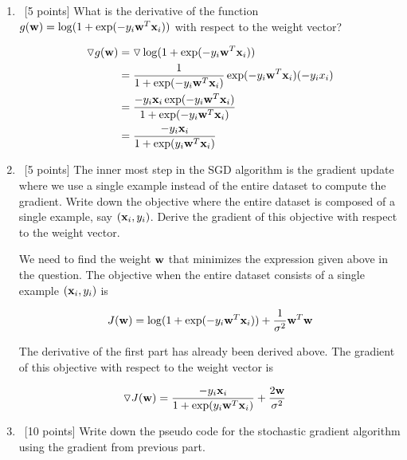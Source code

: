 \begin{enumerate}
\item ~[5 points] What is the derivative of the function $g({\bf w}) = \log(1+ \exp(-y_i{\bf w}^T{\bf x}_i))$ with respect to the weight vector?

\begin{equation*}
\begin{aligned}
\triangledown g({\bf w}) &= \triangledown \log(1+ \exp(-y_i{\bf w}^T{\bf x}_i))\\
&= \frac{1}{1+ \exp(-y_i{\bf w}^T{\bf x}_i)} \exp(-y_i{\bf w}^T{\bf x}_i) (-y_i x_i)\\
&= \frac{-y_i {\bf x}_i \exp(-y_i{\bf w}^T{\bf x}_i)}{1+ \exp(-y_i{\bf w}^T{\bf x}_i)} \\
&= \frac{-y_i {\bf x}_i}{1+ \exp(y_i{\bf w}^T{\bf x}_i)}
\end{aligned}
\end{equation*}


\item ~[5 points] The inner most step in the SGD algorithm is the gradient update where we use a single example instead of the entire dataset to compute the gradient. Write down the objective where the entire dataset is composed of a single example, say $({\bf x}_i, y_i)$. Derive the gradient of this objective with respect to the weight vector.

We need to find the weight ${\bf w}$ that minimizes the expression given above in the question. The objective when the entire dataset consists of a single example $({\bf x}_i, y_i)$ is 

\begin{equation*}
\begin{aligned}
J({\bf w}) &= \log(1+ \exp(-y_i{\bf w}^T{\bf x}_i)) + \frac{1}{\sigma^2}{\bf w}^T{\bf w}\\
\end{aligned}
\end{equation*}

The derivative of the first part has already been derived above. The gradient of this objective with respect to the weight vector is

\begin{equation*}
\begin{aligned}
\triangledown J({\bf w}) &= \frac{-y_i {\bf x}_i}{1+ \exp(y_i{\bf w}^T{\bf x}_i)} + \frac{2{\bf w}}{\sigma^2}
\end{aligned}
\end{equation*}

\item ~[10 points] Write down the pseudo code for the stochastic gradient algorithm using the gradient from previous part.




\end{enumerate}

